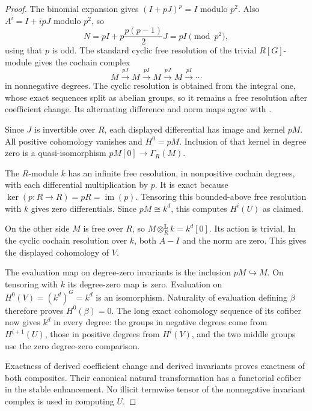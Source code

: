 \documentclass[11pt]{article}
\theoremstyle{definition}
\theoremstyle{remark}
\begin{document}
\begin{proof}
The binomial expansion gives $(I+pJ)^p=I$ modulo $p^2$. Also $A^i=I+ipJ$ modulo $p^2$, so
\[
 N=pI+p\frac{p(p-1)}2J=pI\pmod{p^2},
\]
using that $p$ is odd. The standard cyclic free resolution of the trivial $R[G]$-module gives the cochain complex
\[
 M\xrightarrow{pJ}M\xrightarrow{pI}M
 \xrightarrow{pJ}M\xrightarrow{pI}\cdots
\]
in nonnegative degrees. The cyclic resolution is obtained from the integral one, whose exact sequences split as abelian groups, so it remains a free resolution after coefficient change. Its alternating difference and norm maps agree with \cite[Chapter II, 1.20 and 3.4]{MilneCFT2020}.

Since $J$ is invertible over $R$, each displayed differential has image and kernel $pM$. All positive cohomology vanishes and $H^0=pM$. Inclusion of that kernel in degree zero is a quasi-isomorphism $pM[0]\to\Gamma_R(M)$.

The $R$-module $k$ has an infinite free resolution, in nonpositive cochain degrees, with each differential multiplication by $p$. It is exact because $\ker(p:R\to R)=pR=\operatorname{im}(p)$. Tensoring this bounded-above free resolution with $k$ gives zero differentials. Since $pM\cong k^d$, this computes $H^i(U)$ as claimed.

On the other side $M$ is free over $R$, so $M\otimes_R^{\mathbf L}k=k^d[0]$. Its action is trivial. In the cyclic cochain resolution over $k$, both $A-I$ and the norm are zero. This gives the displayed cohomology of $V$.

The evaluation map on degree-zero invariants is the inclusion $pM\hookrightarrow M$. On tensoring with $k$ its degree-zero map is zero. Evaluation on $H^0(V)=(k^d)^G=k^d$ is an isomorphism. Naturality of evaluation defining $\beta$ therefore proves $H^0(\beta)=0$. The long exact cohomology sequence of its cofiber now gives $k^d$ in every degree: the groups in negative degrees come from $H^{i+1}(U)$, those in positive degrees from $H^i(V)$, and the two middle groups use the zero degree-zero comparison.

Exactness of derived coefficient change and derived invariants proves exactness of both composites. Their canonical natural transformation has a functorial cofiber in the stable enhancement. No illicit termwise tensor of the nonnegative invariant complex is used in computing $U$.
\end{proof}
\end{document}
